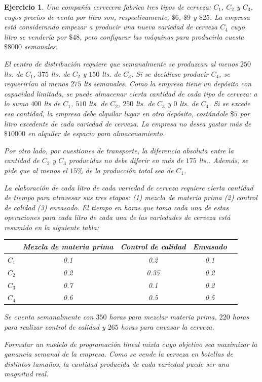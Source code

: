 \documentclass[a4paper,oneside,12pt]{amsart}
\newtheorem{quest}{Ejercicio}
\begin{document}



\begin{quest} 
Una compañía cervecera fabrica tres tipos de cerveza: $C_1$, $C_2$ y $C_3$, cuyos precios de venta por litro son, respectivamente, $\$6$, $\$9$ y $\$25$. La empresa está considerando empezar a producir una nueva variedad de cerveza $C_4$ cuyo litro se vendería por $\$48$, pero configurar las máquinas para producirla cuesta $\$8000$ semanales.

El centro de distribución requiere que semanalmente se produzcan al menos $250$ lts. de $C_1$, $375$ lts. de $C_2$ y $150$ lts. de $C_3$. Si se decidiese producir $C_4$, se requerirían al menos $275$ lts semanales. Como la empresa tiene un depósito con capacidad limitada, se puede almacenar cierta cantidad de cada tipo de cerveza: a lo sumo $400$ lts de $C_1$, $510$ lts. de $C_2$, $250$ lts. de $C_3$ y $0$ lts. de $C_4$. Si se excede esa cantidad, la empresa debe alquilar lugar en otro depósito, costándole $\$5$ por litro excedente de cada variedad de cerveza. La empresa no desea gastar más de $\$10000$ en alquiler de espacio para almacenamiento.

Por otro lado, por cuestiones de transporte, la diferencia absoluta entre la cantidad de $C_2$ y $C_3$ producidas no debe diferir en más de $175$ lts.. Además, se pide que al menos el $15\%$ de la producción total sea de $C_1$.

La elaboración de cada litro de cada variedad de cerveza requiere cierta cantidad de tiempo para atravesar sus tres etapas: (1) mezcla de materia prima (2) control de calidad (3) envasado. El tiempo en horas que toma cada una de estas operaciones para cada litro de cada una de las variedades de cerveza está resumido en la siguiente tabla:
\begin{table}[h!]
    \centering
    \begin{tabular}{ccccc}
         & Mezcla de materia prima & Control de calidad & Envasado \\\midrule
        $C_1$ & 0.1 & 0.2 & 0.1 \\
        $C_2$ & 0.2 & 0.35 & 0.2 \\
        $C_3$ & 0.7 & 0.1 & 0.2 \\
        $C_4$ & 0.6 & 0.5 & 0.5 \\
    \end{tabular}
\end{table}

Se cuenta semanalmente con $350$ horas para mezclar materia prima, $220$ horas para realizar control de calidad y $265$ horas para envasar la cerveza. 

Formular un modelo de programación lineal mixta cuyo objetivo sea maximizar la ganancia semanal de la empresa. Como se vende la cerveza en botellas de distintos tamaños, la cantidad producida de cada variedad puede ser una magnitud real.

\end{quest}

\end{document}
